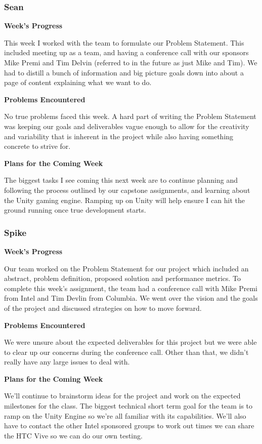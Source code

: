 \documentclass[10pt,journal,compsoc,onecolumn, draftclsnofoot]{IEEEtran}
\begin{document}
\subsubsection{Sean}
\noindent \textbf{Week's Progress}

This week I worked with the team to formulate our Problem Statement. This included meeting up as a team, and having a conference call with our sponsors Mike Premi and Tim Delvin (referred to in the future as just Mike and Tim). We had to distill a bunch of information and big picture goals down into about a page of content explaining what we want to do.

\noindent \textbf{Problems Encountered}

No true problems faced this week.  A hard part of writing the Problem Statement was keeping our goals and deliverables vague enough to allow for the creativity and variability that is inherent in the project while also having something concrete to strive for.

\noindent \textbf{Plans for the Coming Week}

The biggest tasks I see coming this next week are to continue planning and following the process outlined by our capstone assignments, and learning about the Unity gaming engine.  Ramping up on Unity will help ensure I can hit the ground running once true development starts.

\subsubsection{Spike}
\noindent \textbf{Week's Progress}

Our team worked on the Problem Statement for our project which included an abstract, problem definition, proposed solution and performance metrics. To complete this week's assignment, the team had a conference call with Mike Premi from Intel and Tim Devlin from Columbia. We went over the vision and the goals of the project and discussed strategies on how to move forward.

\noindent \textbf{Problems Encountered}

We were unsure about the expected deliverables for this project but we were able to clear up our concerns during the conference call. Other than that, we didn't really have any large issues to deal with.

\noindent \textbf{Plans for the Coming Week}

We'll continue to brainstorm ideas for the project and work on the expected milestones for the class. The biggest technical short term goal for the team is to ramp on the Unity Engine so we're all familiar with its capabilities. We'll also have to contact the other Intel sponsored groups to work out times we can share the HTC Vive so we can do our own testing.
\end{document}
